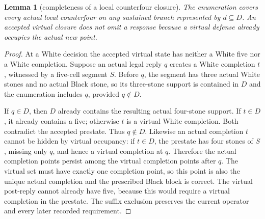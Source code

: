 \documentclass[11pt]{article}
\newtheorem{lemma}[theorem]{Lemma}
\theoremstyle{definition}
\theoremstyle{remark}
\begin{document}
\begin{lemma}[completeness of a local counterfour closure]\label{mac:local-counter}
The enumeration covers every actual local counterfour on any sustained branch represented by \(d\subseteq D\). An accepted virtual closure does not omit a response because a virtual defense already occupies the actual new point.

\end{lemma}
\begin{proof}
At a White decision the accepted virtual state has neither a White five nor a White completion. Suppose an actual legal reply \(q\) creates a White completion \(t\), witnessed by a five-cell segment \(S\). Before \(q\), the segment has three actual White stones and no actual Black stone, so its three-stone support is contained in \(D\) and the enumeration includes \(q\), provided \(q\notin D\).

If \(q\in D\), then \(D\) already contains the resulting actual four-stone support. If \(t\in D\), it already contains a five; otherwise \(t\) is a virtual White completion. Both contradict the accepted prestate. Thus \(q\notin D\). Likewise an actual completion \(t\) cannot be hidden by virtual occupancy: if \(t\in D\), the prestate has four stones of \(S\), missing only \(q\), and hence a virtual completion at \(q\). Therefore the actual completion points persist among the virtual completion points after \(q\). The virtual set must have exactly one completion point, so this point is also the unique actual completion and the prescribed Black block is correct. The virtual post-reply cannot already have five, because this would require a virtual completion in the prestate. The suffix exclusion preserves the current operator and every later recorded requirement. 
\end{proof}
\end{document}
